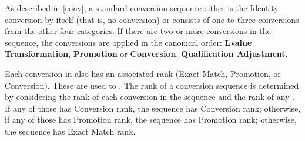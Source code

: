 \pnum
\begin{note}
As described in \ref{conv},
a standard conversion sequence either is the Identity conversion
by itself (that is, no conversion) or consists of one to three
conversions from the other
four categories.
If there are two or more conversions in the sequence, the
conversions are applied in the canonical order:
\textbf{Lvalue Transformation},
\textbf{Promotion}
or
\textbf{Conversion},
\textbf{Qualification Adjustment}.
\end{note}

\pnum
{}%
Each conversion in 
also has an associated rank (Exact
Match, Promotion, or Conversion).
These are used
to .
The rank of a conversion sequence is determined by considering the
rank of each conversion in the sequence and the rank of any .
If any of those has Conversion rank, the
sequence has Conversion rank; otherwise, if any of those has Promotion rank,
the sequence has Promotion rank; otherwise, the sequence has Exact
Match rank.

